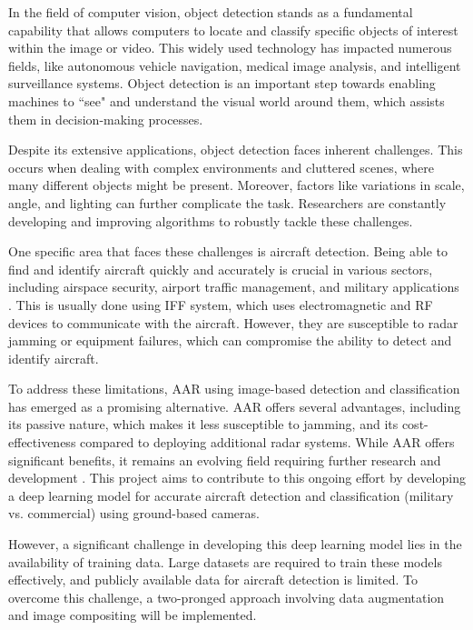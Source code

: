 In the field of computer vision, object detection stands as a fundamental capability that allows computers to locate and classify specific objects of interest within the image or video. This widely used technology has impacted numerous fields, like autonomous vehicle navigation, medical image analysis, and intelligent surveillance systems. Object detection is an important step towards enabling machines to ``see" and understand the visual world around them, which assists them in decision-making processes.

Despite its extensive applications, object detection faces inherent challenges. This occurs when dealing with complex environments and cluttered scenes, where many different objects might be present. Moreover, factors like variations in scale, angle, and lighting can further complicate the task.  Researchers are constantly developing and improving algorithms to robustly tackle these challenges.

One specific area that faces these challenges is aircraft detection.  Being able to find and identify aircraft quickly and accurately is crucial in various sectors, including airspace security, airport traffic management, and military applications \cite{Arwin:09}. This is usually done using IFF system, which uses electromagnetic and RF devices to communicate with the aircraft. However, they are susceptible to radar jamming or equipment failures, which can compromise the ability to detect and identify aircraft. 

To address these limitations, AAR using image-based detection and classification has emerged as a promising alternative. AAR offers several advantages, including its passive nature, which makes it less susceptible to jamming, and its cost-effectiveness compared to deploying additional radar systems. While AAR offers significant benefits, it remains an evolving field requiring further research and development \cite{zhao:21}. This project aims to contribute to this ongoing effort by developing a deep learning model for accurate aircraft detection and classification (military vs. commercial) using ground-based cameras.

However, a significant challenge in developing this deep learning model lies in the availability of training data.  Large datasets are required to train these models effectively, and publicly available data for aircraft detection is limited. To overcome this challenge, a two-pronged approach involving data augmentation and image compositing will be implemented.

